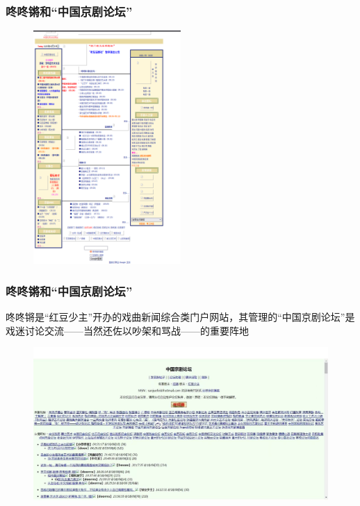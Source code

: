 \documentclass[cjk,slidestop,compress,mathserif,blue]{beamer}
\begin{document}
\frame
{
	\frametitle{咚咚锵和“中国京剧论坛”}
\begin{figure}[h!]
\centering
\vspace{-0.2in}
\includegraphics[height=0.8\textwidth,width=0.5\textwidth,clip]{Figures/PekOpe_Dongdongqiang.png}
\label{ChnOpe-1}
\end{figure}
}

\frame
{
	\frametitle{咚咚锵和“中国京剧论坛”}
	咚咚锵是“红豆少主”开办的戏曲新闻综合类门户网站，其管理的“中国京剧论坛”是戏迷讨论交流——当然还佐以吵架和骂战——的重要阵地
\begin{figure}[h!]
\centering
\vspace{-0.15in}
\includegraphics[height=0.55\textwidth,width=1.00\textwidth,clip]{Figures/PekOpe_ChnOpe.jpg}
\label{ChnOpe-2}
\end{figure}
}
\end{document}
